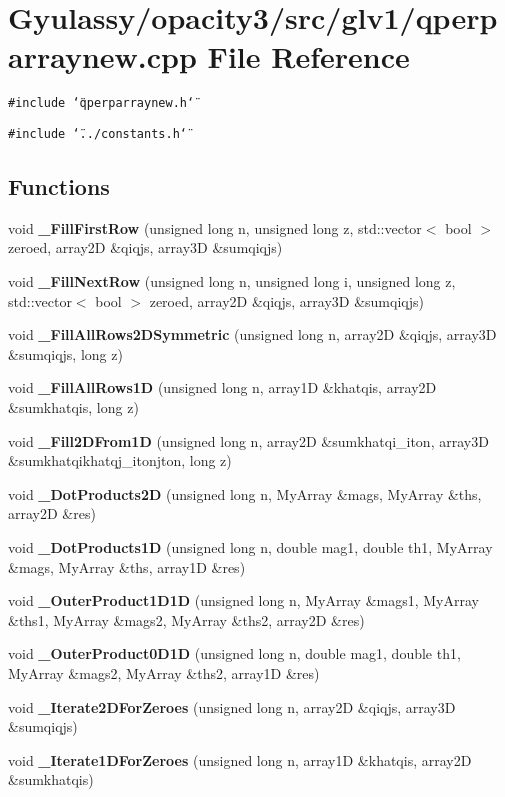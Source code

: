 \section{Gyulassy/opacity3/src/glv1/qperparraynew.cpp File Reference}
\label{qperparraynew_8cpp}
{\tt \#include \char`\"{}qperparraynew.h\char`\"{}}\par
{\tt \#include \char`\"{}../constants.h\char`\"{}}\par
\subsection*{Functions}
\begin{CompactItemize}
\item 
void {\bf \_\-FillFirstRow} (unsigned long n, unsigned long z, std::vector$<$ bool $>$ zeroed, array2D \&qiqjs, array3D \&sumqiqjs)
\item 
void {\bf \_\-FillNextRow} (unsigned long n, unsigned long i, unsigned long z, std::vector$<$ bool $>$ zeroed, array2D \&qiqjs, array3D \&sumqiqjs)
\item 
void {\bf \_\-FillAllRows2DSymmetric} (unsigned long n, array2D \&qiqjs, array3D \&sumqiqjs, long z)
\item 
void {\bf \_\-FillAllRows1D} (unsigned long n, array1D \&khatqis, array2D \&sumkhatqis, long z)
\item 
void {\bf \_\-Fill2DFrom1D} (unsigned long n, array2D \&sumkhatqi\_\-iton, array3D \&sumkhatqikhatqj\_\-itonjton, long z)
\item 
void {\bf \_\-DotProducts2D} (unsigned long n, MyArray \&mags, MyArray \&ths, array2D \&res)
\item 
void {\bf \_\-DotProducts1D} (unsigned long n, double mag1, double th1, MyArray \&mags, MyArray \&ths, array1D \&res)
\item 
void {\bf \_\-OuterProduct1D1D} (unsigned long n, MyArray \&mags1, MyArray \&ths1, MyArray \&mags2, MyArray \&ths2, array2D \&res)
\item 
void {\bf \_\-OuterProduct0D1D} (unsigned long n, double mag1, double th1, MyArray \&mags2, MyArray \&ths2, array1D \&res)
\item 
void {\bf \_\-Iterate2DForZeroes} (unsigned long n, array2D \&qiqjs, array3D \&sumqiqjs)
\item 
void {\bf \_\-Iterate1DForZeroes} (unsigned long n, array1D \&khatqis, array2D \&sumkhatqis)
\end{CompactItemize}


